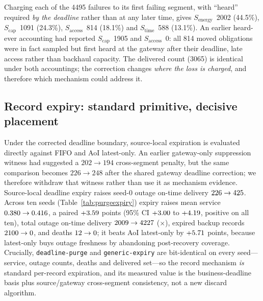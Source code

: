 \documentclass[journal,10pt]{IEEEtran}
\newcommand{\stime}{$S_{\mathrm{time}}$\xspace}
\newcommand{\scap}{$S_{\mathrm{cap}}$\xspace}
\newcommand{\senergy}{$S_{\mathrm{energy}}$\xspace}
\newcommand{\saccess}{$S_{\mathrm{access}}$\xspace}
\begin{document}
\begin{table}[t]
\centering\small
\caption{Counterfactual interventions over 7560 obligations (Episode~I). Set decomposition over the
tested configurations; not an upper bound over all legal policies.}
\label{tab:walls}

\end{table}

Charging each of the 4495 failures to its first failing segment, with ``heard'' required
\emph{by the deadline} rather than at any later time, gives \senergy\ 2002 (44.5\%), \scap\ 1091
(24.3\%), \saccess\ 814 (18.1\%) and \stime\ 588 (13.1\%). An earlier heard-ever accounting had
reported \scap\ 1905 and \saccess\ 0: all 814 moved obligations were in fact sampled but first
heard at the gateway after their deadline, late access rather than backhaul capacity. The
delivered count (3065) is identical under both accountings; the correction changes \emph{where the
loss is charged}, and therefore which mechanism could address it.

\subsection{Record expiry: standard primitive, decisive placement}
\label{sec:eval-record}
Under the corrected deadline boundary, source-local expiration is evaluated directly against FIFO
and AoI latest-only. An earlier gateway-only suppression witness had suggested a $202\to194$
cross-segment penalty, but the same comparison becomes $226\to248$ after the shared gateway
deadline correction; we therefore withdraw that witness rather than use it as mechanism evidence.
Source-local deadline expiry raises seed-0 outage on-time delivery
$226\to425$. Across ten seeds
(Table~\ref{tab:purgeexpiry}) expiry raises mean service $0.380\to0.416$, a paired $+3.59$ points
(95\% CI $+3.00$ to $+4.19$, positive on all ten), total outage on-time delivery $2009\to4227$
(\cThreeRatio$\times$), expired backup records $2100\to0$, and deaths $12\to0$; it beats AoI latest-only by
$+5.71$ points, because latest-only buys outage freshness by abandoning
post-recovery coverage. Crucially, \texttt{deadline-purge} and \texttt{generic-expiry} are
bit-identical on every seed---service, outage counts, deaths and delivered set---so the record
mechanism \emph{is} standard per-record expiration, and its measured value is the business-deadline
basis plus source/gateway cross-segment consistency, not a new discard algorithm.
\end{document}
